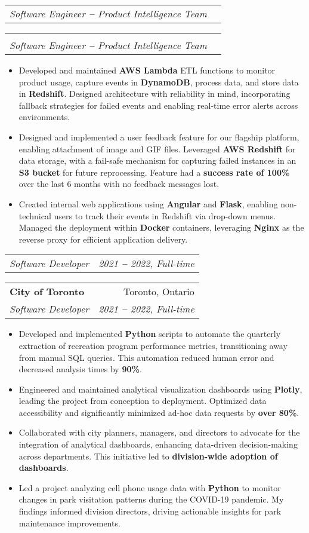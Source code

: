\documentclass[letterpaper,10pt]{article}
\makeatletter
\newcommand{\resumeItem}[1]{
  \item\small{
    {#1 \vspace{-2pt}}
  }
}
\newcommand{\resumeSubheading}[4]{
  \vspace{-2pt}\item
    \ifthenelse{\equal{#1}{}}
    {
    \begin{tabular*}{0.97\textwidth}[t]{l@{\extracolsep{\fill}}r}
      \textit{\small#3} & \textit{\small #4} \\
    \end{tabular*}\vspace{-7pt}
    }
    {
    \begin{tabular*}{0.97\textwidth}[t]{l@{\extracolsep{\fill}}r}
      \textbf{#1} & #2 \\
      \textit{\small#3} & \textit{\small #4} \\
    \end{tabular*}\vspace{-7pt}
    }
}
\newcommand{\resumeItemListStart}{\begin{itemize}}
\newcommand{\resumeItemListEnd}{\end{itemize}\vspace{-5pt}}
\makeatother
\begin{document}
    \resumeSubheading
      {}{}
      {Software Engineer \textbf{--} Product Intelligence Team}{}
        \resumeItemListStart
            \resumeItem{Developed and maintained \textbf{AWS Lambda} ETL functions to monitor product usage, capture events in \textbf{DynamoDB}, process data, and store data in \textbf{Redshift}. Designed architecture with reliability in mind, incorporating fallback strategies for failed events and enabling real-time error alerts across environments.}
            \resumeItem{Designed and implemented a user feedback feature for our flagship platform, enabling attachment of image and GIF files. Leveraged \textbf{AWS Redshift} for data storage, with a fail-safe mechanism for capturing failed instances in an \textbf{S3 bucket} for future reprocessing. Feature had a \textbf{success rate of 100\%} over the last 6 months with no feedback messages lost.}
            \resumeItem{Created internal web applications using \textbf{Angular} and \textbf{Flask}, enabling non-technical users to track their events in Redshift via drop-down menus. Managed the deployment within \textbf{Docker} containers, leveraging \textbf{Nginx} as the reverse proxy for efficient application delivery.}
        \resumeItemListEnd


    \resumeSubheading
      {City of Toronto}{Toronto, Ontario}
      {Software Developer}{2021 \textbf{--} 2022, Full-time}
        \resumeItemListStart
            \resumeItem{Developed and implemented \textbf{Python} scripts to automate the quarterly extraction of recreation program performance metrics, transitioning away from manual SQL queries. This automation reduced human error and decreased analysis times by \textbf{90\%}.}
            \resumeItem{Engineered and maintained analytical visualization dashboards using \textbf{Plotly}, leading the project from conception to deployment. Optimized data accessibility and significantly minimized ad-hoc data requests by \textbf{over 80\%}.}
            \resumeItem{Collaborated with city planners, managers, and directors to advocate for the integration of analytical dashboards, enhancing data-driven decision-making across departments. This initiative led to \textbf{division-wide adoption of dashboards}.}
            \resumeItem{Led a project analyzing cell phone usage data with \textbf{Python} to monitor changes in park visitation patterns during the COVID-19 pandemic. My findings informed division directors, driving actionable insights for park maintenance improvements.}
        \resumeItemListEnd
    
\end{document}
